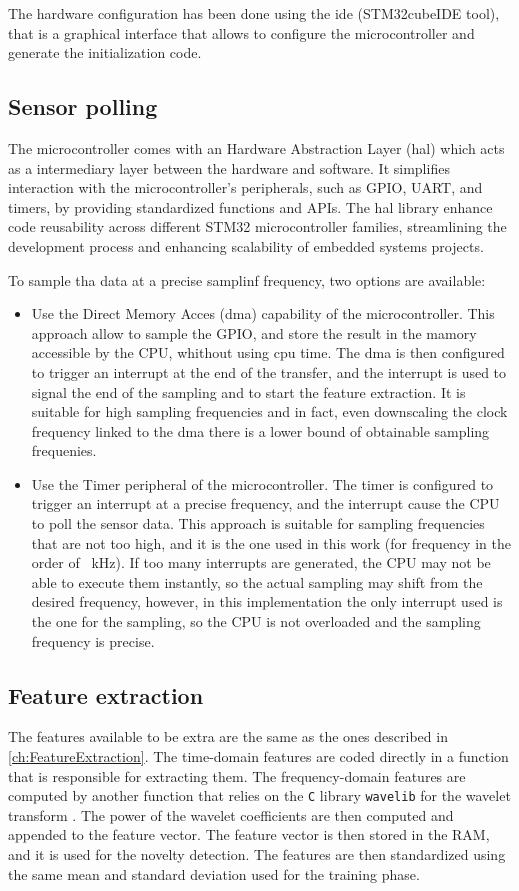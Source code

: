 The hardware configuration has been done using the \gls{ide} ({STM32cubeIDE} tool), that is a graphical interface that allows to configure the microcontroller and generate the initialization code. 

\subsection{Sensor polling}
The microcontroller comes with an Hardware Abstraction Layer (\gls{hal}) which acts as a intermediary layer between the hardware and software. It simplifies interaction with the microcontroller's peripherals, such as GPIO, UART, and timers, by providing standardized functions and APIs. The \gls{hal} library enhance code reusability across different STM32 microcontroller families, streamlining the development process and enhancing scalability of embedded systems projects.

To sample tha data at a precise samplinf frequency, two options are available:
\begin{itemize}
    \item Use the Direct Memory Acces (\gls{dma}) capability of the microcontroller. This approach allow to sample the GPIO, and store the result in the mamory accessible by the CPU, whithout using cpu time. The \gls{dma} is then configured to trigger an interrupt at the end of the transfer, and the interrupt is used to signal the end of the sampling and to start the feature extraction. It is suitable for high sampling frequencies and in fact, even downscaling the clock frequency linked to the \gls{dma} there is a lower bound of obtainable sampling frequenies.
    \item Use the Timer peripheral of the microcontroller. The timer is configured to trigger an interrupt at a precise frequency, and the interrupt cause the CPU to poll the sensor data. This approach is suitable for sampling frequencies that are not too high, and it is the one used in this work (for frequency in the order of \SI{ }{\kilo\hertz}).
    If too many interrupts are generated, the CPU may not be able to execute them instantly, so the actual sampling may shift from the desired frequency, however, in this implementation the only interrupt used is the one for the sampling, so the CPU is not overloaded and the sampling frequency is precise.
\end{itemize}


\subsection{Feature extraction}
The features available to be extra are the same as the ones described in \autoref{ch:FeatureExtraction}. The time-domain features are coded directly in a function that is responsible for extracting them. The frequency-domain features are computed by another function that relies on the \texttt{C} library \texttt{wavelib} for the wavelet transform \cite{wavelib}. The power of the wavelet coefficients are then computed and appended to the feature vector. The feature vector is then stored in the RAM, and it is used for the novelty detection.
The features are then standardized using the same mean and standard deviation used for the training phase. 

